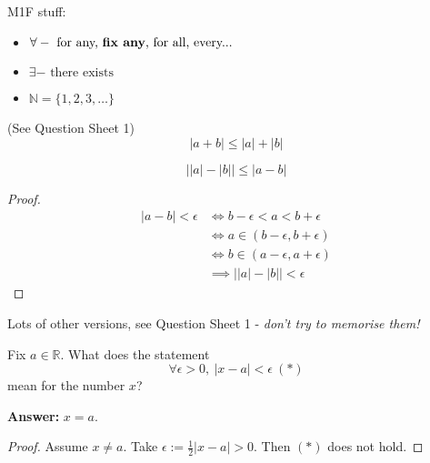 
\pagebreak
\setcounter{section}{-1}

\setcounter{lecture}{0}



M1F stuff:

\begin{itemize}
\item $\forall - \text{ for any, \textbf{fix any}, for all, every...}$
\item $\exists - \text{ there exists}$
\item $\mathbb{N} = \{1,2,3,\dots\}$ 
\end{itemize}

\begin{theorem}
(See Question Sheet 1)
	\[|a+b| \leq |a| + |b|\]
\end{theorem}

\begin{corollary}
\[\left||a| - |b|\right|\leq |a-b|	\]
\end{corollary}
\begin{proof}
\[
\begin{aligned}
|a-b| < \epsilon &\iff b-\epsilon < a < b + \epsilon\\
&\iff a \in (b-\epsilon, b+\epsilon)\\
&\iff b \in (a-\epsilon, a+\epsilon)	\\
&\implies \left||a| - |b|\right|< \epsilon
\end{aligned} \] 
\end{proof}

Lots of other versions, see Question Sheet 1 - \emph{don't try to memorise them!}\\



\begin{clicker}
Fix $a \in \mathbb{R}$. What does the statement 
\[\forall \epsilon >0,~|x-a|<\epsilon ~(*)\]
mean for the number $x$? 

\textbf{Answer:} $x = a$. 
\begin{proof}
Assume $x \neq a$. Take $\epsilon := \frac{1}{2}|x-a| > 0$. Then $(*)$ does not hold.	
\end{proof}

\end{clicker}







